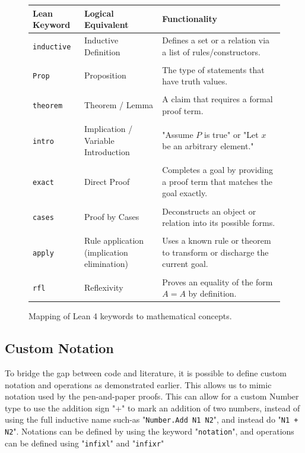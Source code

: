 \begin{figure}[H]
\centering
\begin{tabularx}{\textwidth}{lXX}
\hline
\textbf{Lean Keyword} & \textbf{Logical Equivalent} & \textbf{Functionality} \\ \hline
\texttt{inductive}    & Inductive Definition      & Defines a set or a relation via a list of rules/constructors. \\ \\
\texttt{Prop}         & Proposition               & The type of statements that have truth values. \\ \\
\texttt{theorem}      & Theorem / Lemma           & A claim that requires a formal proof term. \\ \\
\texttt{intro}        & Implication / Variable Introduction  & "Assume $P$ is true" or "Let $x$ be an arbitrary element." \\ \\
\texttt{exact}        & Direct Proof              & Completes a goal by providing a proof term that matches the goal exactly. \\ \\
\texttt{cases}        & Proof by Cases       & Deconstructs an object or relation into its possible forms. \\ \\
\texttt{apply}        & Rule application (implication elimination) & Uses a known rule or theorem to transform or discharge the current goal. \\ \\
\texttt{rfl}          & Reflexivity               & Proves an equality of the form $A = A$ by definition. \\ \hline
\end{tabularx}
\caption{Mapping of Lean 4 keywords to mathematical concepts.}
\end{figure}

\subsection{Custom Notation}
To bridge the gap between code and literature,
it is possible to define custom notation and operations as demonstrated earlier.
This allows us to mimic notation used by the pen-and-paper proofs.
This can allow for a custom Number type to use the addition sign "+"
to mark an addition of two numbers, instead of using the full inductive name such-as 
"\texttt{Number.Add N1 N2}", and instead do "\texttt{N1 + N2}".
Notations can be defined by using the keyword "\texttt{notation}",
and operations can be defined using "\texttt{infixl}" and "\texttt{infixr}"


